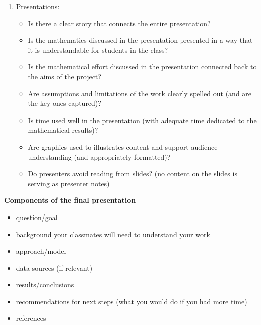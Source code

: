 \documentclass[12pt,letterpaper,noanswers]{exam}
\begin{document}
\begin{enumerate}
\item
Presentations:
\begin{itemize}
    \item Is there a clear story that connects the entire presentation?
    \item  Is the mathematics discussed in the presentation presented in a way that it is understandable for students in the class?
    \item Is the mathematical effort discussed in the presentation connected back to the aims of the project?
    \item Are assumptions and limitations of the work clearly spelled out (and are the key ones captured)?
    \item Is time used well in the presentation (with adequate time dedicated to the mathematical results)?
    \item Are graphics used to illustrates content and support audience understanding (and appropriately formatted)?
    \item Do presenters avoid reading from slides? (no content on the slides is serving as presenter notes)
\end{itemize}
\end{enumerate}

\textbf{Components of the final presentation}
\begin{itemize}
\item question/goal
\item background your classmates will need to understand your work
\item approach/model
\item data sources (if relevant)
\item results/conclusions
\item recommendations for next steps (what you would do if you had more time)
\item references
\end{itemize}
\end{document}
